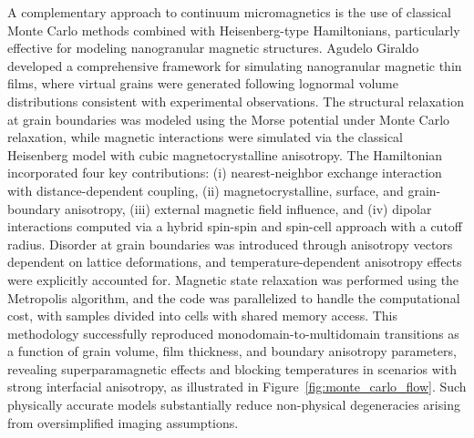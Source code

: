 \documentclass[letterpaper, 12, one column]{article}
\begin{document}
A complementary approach to continuum micromagnetics is the use of classical Monte Carlo methods combined with Heisenberg-type Hamiltonians, particularly effective for modeling nanogranular magnetic structures. Agudelo Giraldo \cite{AgudeloGiraldo2018} developed a comprehensive framework for simulating nanogranular magnetic thin films, where virtual grains were generated following lognormal volume distributions consistent with experimental observations. The structural relaxation at grain boundaries was modeled using the Morse potential under Monte Carlo relaxation, while magnetic interactions were simulated via the classical Heisenberg model with cubic magnetocrystalline anisotropy. The Hamiltonian incorporated four key contributions: (i) nearest-neighbor exchange interaction with distance-dependent coupling, (ii) magnetocrystalline, surface, and grain-boundary anisotropy, (iii) external magnetic field influence, and (iv) dipolar interactions computed via a hybrid spin-spin and spin-cell approach with a cutoff radius. Disorder at grain boundaries was introduced through anisotropy vectors dependent on lattice deformations, and temperature-dependent anisotropy effects were explicitly accounted for. Magnetic state relaxation was performed using the Metropolis algorithm, and the code was parallelized to handle the computational cost, with samples divided into cells with shared memory access. This methodology successfully reproduced monodomain-to-multidomain transitions as a function of grain volume, film thickness, and boundary anisotropy parameters, revealing superparamagnetic effects and blocking temperatures in scenarios with strong interfacial anisotropy, as illustrated in Figure~\ref{fig:monte_carlo_flow}. Such physically accurate models substantially reduce non-physical degeneracies arising from oversimplified imaging assumptions.
\end{document}
